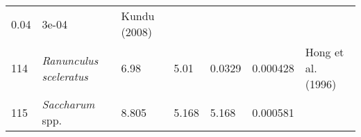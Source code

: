\documentclass[]{article}
\begin{document}
\begin{longtable}[]{@{}lllllll@{}}
\begin{minipage}[t]{0.08\columnwidth}
0.04\strut
\end{minipage} & \begin{minipage}[t]{0.08\columnwidth}\raggedright
3e-04\strut
\end{minipage} & \begin{minipage}[t]{0.23\columnwidth}\raggedright
Kundu (2008)\strut
\end{minipage}\tabularnewline
\begin{minipage}[t]{0.05\columnwidth}\raggedright
114\strut
\end{minipage} & \begin{minipage}[t]{0.23\columnwidth}\raggedright
\emph{Ranunculus sceleratus}\strut
\end{minipage} & \begin{minipage}[t]{0.05\columnwidth}\raggedright
6.98\strut
\end{minipage} & \begin{minipage}[t]{0.08\columnwidth}\raggedright
5.01\strut
\end{minipage} & \begin{minipage}[t]{0.08\columnwidth}\raggedright
0.0329\strut
\end{minipage} & \begin{minipage}[t]{0.08\columnwidth}\raggedright
0.000428\strut
\end{minipage} & \begin{minipage}[t]{0.23\columnwidth}\raggedright
Hong et al. (1996)\strut
\end{minipage}\tabularnewline
\begin{minipage}[t]{0.05\columnwidth}\raggedright
115\strut
\end{minipage} & \begin{minipage}[t]{0.23\columnwidth}\raggedright
\emph{Saccharum }spp.\strut
\end{minipage} & \begin{minipage}[t]{0.05\columnwidth}\raggedright
8.805\strut
\end{minipage} & \begin{minipage}[t]{0.08\columnwidth}\raggedright
5.168\strut
\end{minipage} & \begin{minipage}[t]{0.08\columnwidth}\raggedright
5.168\strut
\end{minipage} & \begin{minipage}[t]{0.08\columnwidth}\raggedright
0.000581\strut
\end{minipage} & \begin{minipage}[t]{0.23\columnwidth}\raggedright

\end{minipage}
\end{longtable}
\end{document}
